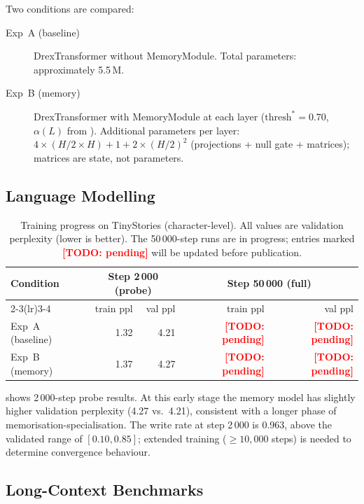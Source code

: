\documentclass{article}
\providecommand{\todo}[1]{\textcolor{red}{\textbf{[TODO: #1]}}}
\begin{document}
Two conditions are compared:
\begin{description}
  \item[Exp~A (baseline)] DrexTransformer without MemoryModule.  Total parameters:
    approximately 5.5\,M.
  \item[Exp~B (memory)] DrexTransformer with MemoryModule at each layer
    ($\mathrm{thresh}^*=0.70$, $\alpha(L)$ from ).  Additional
    parameters per layer: $4 \times (H/2 \times H) + 1 + 2 \times (H/2)^2$ (projections
    + null gate + matrices); matrices are state, not parameters.
\end{description}

\subsection{Language Modelling}

\begin{table}[h]
  \centering
  \small
  \caption{Training progress on TinyStories (character-level).  All values are
    validation perplexity (lower is better).  The 50\,000-step runs are in progress;
    entries marked \todo{pending} will be updated before publication.}
  \label{tab:results-lm}
  \begin{tabular}{lrrrr}
    \toprule
    \multirow{2}{*}{\textbf{Condition}} &
    \multicolumn{2}{c}{\textbf{Step 2\,000 (probe)}} &
    \multicolumn{2}{c}{\textbf{Step 50\,000 (full)}} \\
    \cmidrule(lr){2-3}\cmidrule(lr){3-4}
    & train ppl & val ppl & train ppl & val ppl \\
    \midrule
    Exp~A (baseline)       & 1.32 & 4.21 & \todo{pending} & \todo{pending} \\
    Exp~B (memory)         & 1.37 & 4.27 & \todo{pending} & \todo{pending} \\
    \bottomrule
  \end{tabular}
\end{table}

 shows 2\,000-step probe results.  At this early stage the memory
model has slightly higher validation perplexity (4.27 vs.\ 4.21), consistent with a
longer phase of memorisation-specialisation.  The write rate at step 2\,000 is 0.963,
above the validated range of $[0.10, 0.85]$; extended training ($\geq 10{,}000$ steps)
is needed to determine convergence behaviour.

\subsection{Long-Context Benchmarks}
\end{document}
